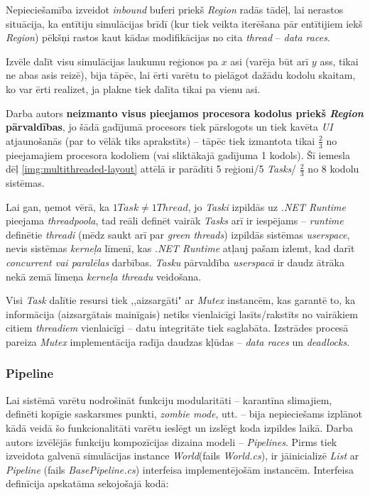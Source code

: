Nepieciešamība izveidot \emph{inbound} buferi priekš \emph{Region} radās tādēļ, lai
nerastos situācija,
ka entītiju simulācijas brīdī (kur tiek veikta iterēšana pār entītijiem iekš \emph{Region}) pēkšņi
rastos kaut kādas modifikācijas no cita \emph{thread} -- \emph{data races}.

Izvēle dalīt visu simulācijas laukumu reģionos pa \(x\) asi (varēja būt arī \(y\)
ass, tikai ne abas asis reizē), bija tāpēc, lai ērti varētu to pielāgot dažādu
kodolu skaitam, ko var ērti realizet, ja plakne tiek dalīta tikai pa vienu asi.

Darba autors \textbf{neizmanto visus pieejamos procesora kodolus priekš \emph{Region} pārvaldības}, jo šādā gadījumā
procesors tiek pārslogots un tiek kavēta \emph{UI} atjaunošanās (par to
vēlāk tiks aprakstīts) -- tāpēc tiek izmantota tikai \(\frac{2}{3}\) no
pieejamajiem procesora kodoliem (vai sliktākajā gadījuma 1 kodols). Šī iemesla dēļ
\ref{img:multithreaded-layout} attēlā ir parādīti 5 reģioni/5 \emph{Tasks}/ \(\frac{2}{3}\) no 8 kodolu sistēmas.

Lai gan, ņemot vērā, ka \(1 Task\neq 1 Thread\), jo \emph{Taski} izpildās uz \emph{.NET Runtime}
pieejama \emph{threadpoola}\cite{csharp:tasks-not-threads}, tad reāli definēt vairāk
\emph{Tasks} arī ir iespējams -- \emph{runtime} definētie \emph{threadi} (mēdz saukt arī par
\emph{green threads}\cite{progr:green-threads}) izpildās
sistēmas \emph{userspace}\cite{sys:userspace}, nevis sistēmas \emph{kerneļa} līmenī, kas \emph{.NET Runtime}
atļauj pašam izlemt, kad darīt \emph{concurrent vai paralēlas}\cite{csharp:concurrent-parallel} darbības.
\emph{Tasku} pārvaldība
\emph{userspacā} ir daudz ātrāka nekā zemā līmeņa \emph{kerneļa threadu} veidošana.

Visi \emph{Task} dalītie resursi tiek ,,aizsargāti" ar \emph{Mutex}\cite{csharp:mutex}
instancēm, kas garantē to, ka informācija (aizsargātais mainīgais) netiks vienlaicīgi lasīts/rakstīts no
vairākiem citiem \emph{threadiem} vienlaicīgi -- datu integritāte tiek saglabāta. Izstrādes procesā
pareiza \emph{Mutex} implementācija radīja daudzas kļūdas -- \emph{data races} un \emph{deadlocks}.

\subsubsection*{Pipeline}

Lai sistēmā varētu nodrošināt funkciju modularitāti -- karantīna slimajiem,
definēti kopīgie saskarsmes punkti, \emph{zombie mode}, utt. -- bija nepieciešams
izplānot kādā veidā šo funkcionalitāti varētu ieslēgt un izslēgt koda izpildes
laikā. Darba autors izvēlējās funkciju kompozīcijas dizaina modeli --
\emph{Pipelines}\cite{progr:pipelines}. Pirms tiek izveidota galvenā simulācijas
instance \emph{World}(fails \emph{World.cs}), ir jāinicializē \emph{List} ar
\emph{Pipeline} (fails \emph{BasePipeline.cs})
interfeisa implementējošām instancēm. Interfeisa definīcija apskatāma sekojošajā kodā:

